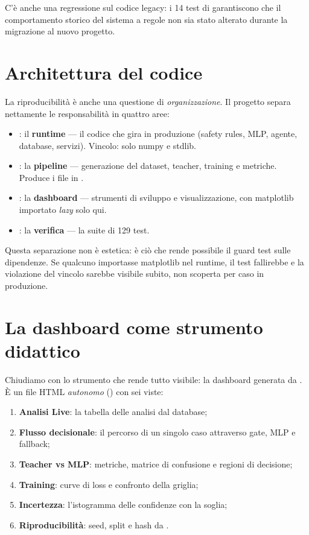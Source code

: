 C'è anche una regressione sul codice legacy: i 14 test di
 garantiscono che il
comportamento storico del sistema a regole non sia stato alterato durante
la migrazione al nuovo progetto.

\section{Architettura del codice}\label{sec:architettura-codice}

La riproducibilità è anche una questione di \emph{organizzazione}. Il
progetto separa nettamente le responsabilità in quattro aree:

\begin{itemize}
  \item {}: il \textbf{runtime} — il
        codice che gira in produzione (safety rules, MLP, agente, database,
        servizi). Vincolo: solo numpy e stdlib.
  \item {}: la \textbf{pipeline} — generazione del dataset,
        teacher, training e metriche. Produce i file in .
  \item {}: la \textbf{dashboard} — strumenti di sviluppo e
        visualizzazione, con matplotlib importato \emph{lazy} solo qui.
  \item {}: la \textbf{verifica} — la suite di 129 test.
\end{itemize}

Questa separazione non è estetica: è ciò che rende possibile il guard test
sulle dipendenze. Se qualcuno importasse matplotlib nel runtime, il test
fallirebbe e la violazione del vincolo sarebbe visibile subito, non scoperta
per caso in produzione.

\section{La dashboard come strumento didattico}\label{sec:dashboard}

Chiudiamo con lo strumento che rende tutto visibile: la dashboard generata
da . È un file HTML \emph{autonomo}
() con sei viste:

\begin{enumerate}
  \item \textbf{Analisi Live}: la tabella delle analisi dal database;
  \item \textbf{Flusso decisionale}: il percorso di un singolo caso
        attraverso gate, MLP e fallback;
  \item \textbf{Teacher vs MLP}: metriche, matrice di confusione e regioni
        di decisione;
  \item \textbf{Training}: curve di loss e confronto della griglia;
  \item \textbf{Incertezza}: l'istogramma delle confidenze con la soglia;
  \item \textbf{Riproducibilità}: seed, split e hash da
        .
\end{enumerate}

